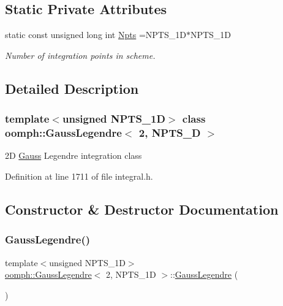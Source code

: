 \subsection*{Static Private Attributes}
\begin{DoxyCompactItemize}
\item 
static const unsigned long int \hyperlink{classoomph_1_1GaussLegendre_3_012_00_01NPTS__1D_01_4_a897ee85bffd6510822ebdc5e60e5faee}{Npts} =N\+P\+T\+S\+\_\+1D$\ast$N\+P\+T\+S\+\_\+1D
\begin{DoxyCompactList}\small\item\em Number of integration points in scheme. \end{DoxyCompactList}\end{DoxyCompactItemize}


\subsection{Detailed Description}
\subsubsection*{template$<$unsigned N\+P\+T\+S\+\_\+1D$>$\newline
class oomph\+::\+Gauss\+Legendre$<$ 2, N\+P\+T\+S\+\_\+D $>$}

2D \hyperlink{classoomph_1_1Gauss}{Gauss} Legendre integration class 

Definition at line 1711 of file integral.\+h.



\subsection{Constructor \& Destructor Documentation}
\mbox{\label{classoomph_1_1GaussLegendre_3_012_00_01NPTS__1D_01_4_a1457debc6ebc05fbfc09392b3488463f}} 
\subsubsection{\texorpdfstring{Gauss\+Legendre()}{GaussLegendre()}}
{\footnotesize\ttfamily template$<$unsigned N\+P\+T\+S\+\_\+1D$>$ \\
\hyperlink{classoomph_1_1GaussLegendre}{oomph\+::\+Gauss\+Legendre}$<$ 2, N\+P\+T\+S\+\_\+1D $>$\+::\hyperlink{classoomph_1_1GaussLegendre}{Gauss\+Legendre} (\begin{DoxyParamCaption}{ }\end{DoxyParamCaption})}



